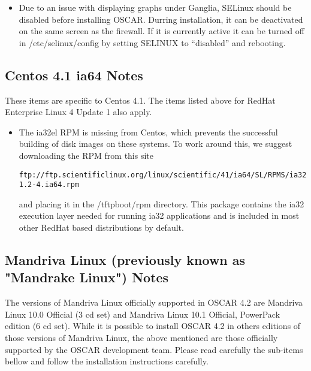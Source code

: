 \begin{itemize}

\item Due to an issue with displaying graphs under Ganglia, SELinux should
  be disabled before installing OSCAR.  Durring installation, it can be
  deactivated on the same screen as the firewall.  If it is currently
  active it can be turned off in /etc/selinux/config by setting SELINUX 
  to ``disabled'' and rebooting.


\end{itemize}

\subsection{Centos 4.1 ia64 Notes}
\label{subsec:fc3notes}

These items are specific to Centos 4.1.  The items listed above for RedHat
Enterprise Linux 4 Update 1 also apply.

\begin{itemize}

\item The ia32el RPM is missing from Centos, which prevents the successful
building of disk images on these systems.  To work around this, we suggest
downloading the RPM from this site
\begin{verbatim}
ftp://ftp.scientificlinux.org/linux/scientific/41/ia64/SL/RPMS/ia32el-1.2-4.ia64.rpm
\end{verbatim}
and placing it in the /tftpboot/rpm directory.  This package contains the
ia32 execution layer needed for running ia32 applications and is included
in most other RedHat based distributions by default.
\end{itemize}


\subsection{Mandriva Linux (previously known as "Mandrake Linux") Notes}
\label{subsec:mdk10notes}

The versions of Mandriva Linux officially supported in OSCAR 4.2 are
Mandriva Linux 10.0 Official (3 cd set) and Mandriva Linux 10.1 Official, 
PowerPack edition (6 cd set). While it is possible to install OSCAR 4.2 in 
others editions of those versions of Mandriva Linux, the above mentioned are
those officially supported by the OSCAR development team. Please read 
carefully the sub-items bellow and follow the installation instructions
carefully. 

